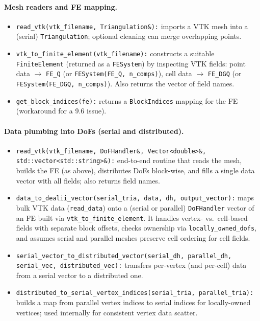 \documentclass[a4paper,12pt]{article}
\begin{document}
\paragraph{Mesh readers and FE mapping.}
\begin{itemize}
  \item \texttt{read\_vtk(vtk\_filename, Triangulation\&):}
        imports a VTK mesh into a (serial) \texttt{Triangulation}; optional
        cleaning can merge overlapping points.
  \item \texttt{vtk\_to\_finite\_element(vtk\_filename):}
        constructs a suitable \texttt{FiniteElement} (returned as a
        \texttt{FESystem}) by inspecting VTK fields:
        point data $\rightarrow$ \texttt{FE\_Q} (or \texttt{FESystem(FE\_Q, n\_comps)}),
        cell data $\rightarrow$ \texttt{FE\_DGQ} (or \texttt{FESystem(FE\_DGQ, n\_comps)}).
        Also returns the vector of field names.
  \item \texttt{get\_block\_indices(fe):}
        returns a \texttt{BlockIndices} mapping for the FE (workaround for a 9.6 issue).
\end{itemize}

\paragraph{Data plumbing into DoFs (serial and distributed).}
\begin{itemize}
  \item \texttt{read\_vtk(vtk\_filename, DoFHandler\&, Vector<double>\&, std::vector<std::string>\&):}
        end-to-end routine that reads the mesh, builds the FE (as above),
        distributes DoFs block-wise, and fills a single data vector with all
        fields; also returns field names.
  \item \texttt{data\_to\_dealii\_vector(serial\_tria, data, dh, output\_vector):}
        maps bulk VTK data (\texttt{read\_data}) onto a (serial or parallel)
        \texttt{DoFHandler} vector of an FE built via \texttt{vtk\_to\_finite\_element}.
        It handles vertex- vs.\ cell-based fields with separate block offsets,
        checks ownership via \texttt{locally\_owned\_dofs}, and assumes serial
        and parallel meshes preserve cell ordering for cell fields.
  \item \texttt{serial\_vector\_to\_distributed\_vector(serial\_dh, parallel\_dh, serial\_vec, distributed\_vec):}
        transfers per-vertex (and per-cell) data from a serial vector to a
        distributed one.
  \item \texttt{distributed\_to\_serial\_vertex\_indices(serial\_tria, parallel\_tria):}
        builds a map from parallel vertex indices to serial indices for
        locally-owned vertices; used internally for consistent vertex data scatter.
\end{itemize}
\end{document}
